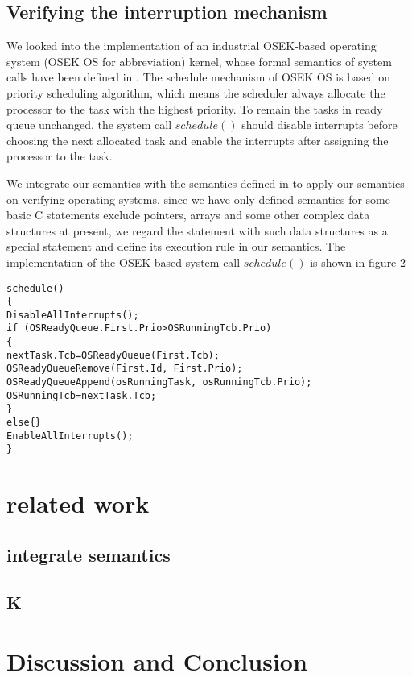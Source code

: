 \documentclass[conference]{IEEEtran}
\begin{document}
\subsection{Verifying the interruption mechanism}
\par We looked into the implementation of an industrial OSEK-based operating system (OSEK OS for abbreviation) kernel, whose formal semantics of system calls have been defined in \cite{}. The schedule mechanism of OSEK OS is based on priority scheduling algorithm, which means the scheduler always allocate the processor to the task with the highest priority. To remain the tasks in ready queue unchanged, the system call $schedule()$ should disable interrupts before choosing the next allocated task and enable the interrupts after assigning the processor to the task.
\par We integrate our semantics with the semantics defined in \cite{} to apply our semantics on verifying operating systems. since we have only defined semantics for some basic C statements exclude pointers, arrays and some other complex data structures at present, we regard the statement with such data structures as a special statement and define its execution rule in our semantics. The implementation of the OSEK-based system call $schedule()$ is shown in figure \ref{}
\begin{lstlisting}[xleftmargin=1em]
schedule()
{
DisableAllInterrupts();
if (OSReadyQueue.First.Prio>OSRunningTcb.Prio)
{
nextTask.Tcb=OSReadyQueue(First.Tcb);
OSReadyQueueRemove(First.Id, First.Prio);
OSReadyQueueAppend(osRunningTask, osRunningTcb.Prio);
OSRunningTcb=nextTask.Tcb;
}
else{}
EnableAllInterrupts();
}
\end{lstlisting}	
\section{related work}
\subsection{integrate semantics}
\subsection{K }
\section{Discussion and Conclusion}
\end{document}
